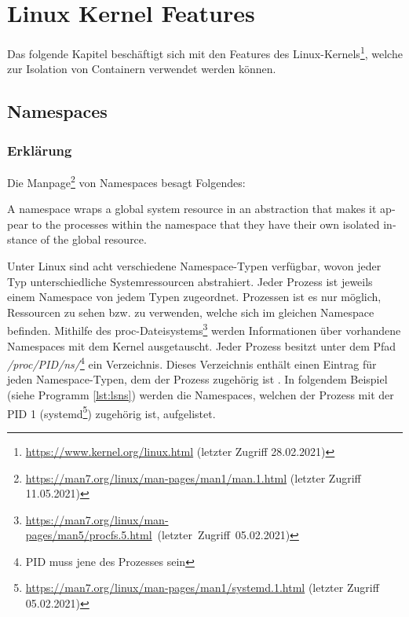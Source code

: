 
\chapter{Linux Kernel Features}
\label{cha:LinuxKernelFeatures}
Das folgende Kapitel beschäftigt sich mit den Features des
Linux-Kernels\footnote{\url{https://www.kernel.org/linux.html} (letzter Zugriff
28.02.2021)}, welche zur Isolation von Containern verwendet werden können. 

\section{Namespaces}
\label{lab:namespaces}

\subsection{Erklärung}
Die Manpage\footnote{\url{https://man7.org/linux/man-pages/man1/man.1.html}
(letzter Zugriff 11.05.2021)} von Namespaces besagt Folgendes:

\begin{english}
\begin{italicquotes}
A namespace  wraps a global system resource in an abstraction that makes it
appear to the processes within the namespace that they have their  own
isolated  instance  of the global resource. \cite{man_namespaces}
\end{italicquotes}
\end{english}

Unter Linux sind acht verschiedene Namespace-Typen verfügbar, wovon jeder Typ
unterschiedliche Systemressourcen abstrahiert. Jeder Prozess ist jeweils einem
Namespace von jedem Typen zugeordnet. Prozessen ist es nur möglich, Ressourcen
zu sehen bzw. zu verwenden, welche sich im gleichen Namespace befinden.
Mithilfe des
\mbox{proc-Dateisystems\footnote{\url{https://man7.org/linux/man-pages/man5/procfs.5.html}
(letzter Zugriff 05.02.2021)}} werden Informationen über vorhandene Namespaces
mit dem Kernel ausgetauscht. Jeder Prozess besitzt unter dem
Pfad \emph{/proc/PID/ns/}\footnote{PID muss jene des Prozesses
sein} ein Verzeichnis. Dieses Verzeichnis enthält einen Eintrag für jeden Namespace-Typen, dem
der Prozess zugehörig ist \cite{man_namespaces}. In folgendem Beispiel (siehe
Programm \ref{lst:lsns}) werden die Namespaces, welchen der Prozess mit der PID
1 (systemd\footnote{\url{https://man7.org/linux/man-pages/man1/systemd.1.html}
(letzter Zugriff 05.02.2021)}) zugehörig ist, aufgelistet. 

